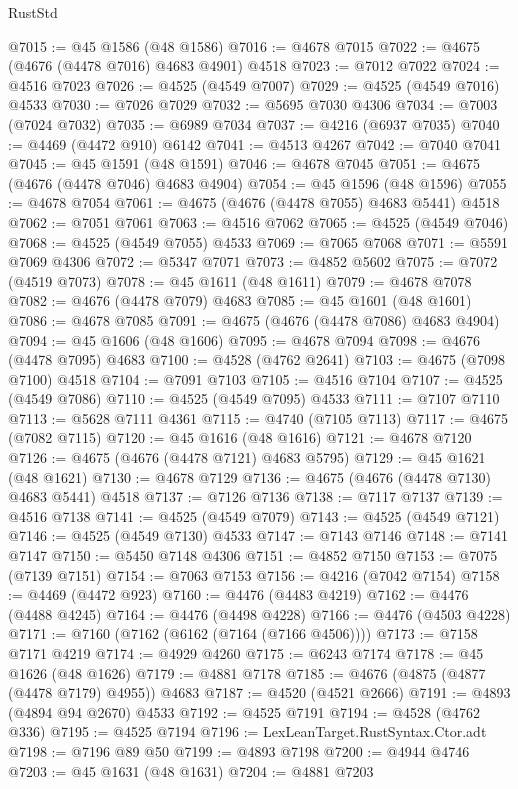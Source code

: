 \begin{lexlean}{RustStd}
\begin{coremodule}
@7015 := @45 @1586 (@48 @1586)
@7016 := @4678 @7015
@7022 := @4675 (@4676 (@4478 @7016) @4683 @4901) @4518
@7023 := @7012 @7022
@7024 := @4516 @7023
@7026 := @4525 (@4549 @7007)
@7029 := @4525 (@4549 @7016) @4533
@7030 := @7026 @7029
@7032 := @5695 @7030 @4306
@7034 := @7003 (@7024 @7032)
@7035 := @6989 @7034
@7037 := @4216 (@6937 @7035)
@7040 := @4469 (@4472 @910) @6142
@7041 := @4513 @4267
@7042 := @7040 @7041
@7045 := @45 @1591 (@48 @1591)
@7046 := @4678 @7045
@7051 := @4675 (@4676 (@4478 @7046) @4683 @4904)
@7054 := @45 @1596 (@48 @1596)
@7055 := @4678 @7054
@7061 := @4675 (@4676 (@4478 @7055) @4683 @5441) @4518
@7062 := @7051 @7061
@7063 := @4516 @7062
@7065 := @4525 (@4549 @7046)
@7068 := @4525 (@4549 @7055) @4533
@7069 := @7065 @7068
@7071 := @5591 @7069 @4306
@7072 := @5347 @7071
@7073 := @4852 @5602
@7075 := @7072 (@4519 @7073)
@7078 := @45 @1611 (@48 @1611)
@7079 := @4678 @7078
@7082 := @4676 (@4478 @7079) @4683
@7085 := @45 @1601 (@48 @1601)
@7086 := @4678 @7085
@7091 := @4675 (@4676 (@4478 @7086) @4683 @4904)
@7094 := @45 @1606 (@48 @1606)
@7095 := @4678 @7094
@7098 := @4676 (@4478 @7095) @4683
@7100 := @4528 (@4762 @2641)
@7103 := @4675 (@7098 @7100) @4518
@7104 := @7091 @7103
@7105 := @4516 @7104
@7107 := @4525 (@4549 @7086)
@7110 := @4525 (@4549 @7095) @4533
@7111 := @7107 @7110
@7113 := @5628 @7111 @4361
@7115 := @4740 (@7105 @7113)
@7117 := @4675 (@7082 @7115)
@7120 := @45 @1616 (@48 @1616)
@7121 := @4678 @7120
@7126 := @4675 (@4676 (@4478 @7121) @4683 @5795)
@7129 := @45 @1621 (@48 @1621)
@7130 := @4678 @7129
@7136 := @4675 (@4676 (@4478 @7130) @4683 @5441) @4518
@7137 := @7126 @7136
@7138 := @7117 @7137
@7139 := @4516 @7138
@7141 := @4525 (@4549 @7079)
@7143 := @4525 (@4549 @7121)
@7146 := @4525 (@4549 @7130) @4533
@7147 := @7143 @7146
@7148 := @7141 @7147
@7150 := @5450 @7148 @4306
@7151 := @4852 @7150
@7153 := @7075 (@7139 @7151)
@7154 := @7063 @7153
@7156 := @4216 (@7042 @7154)
@7158 := @4469 (@4472 @923)
@7160 := @4476 (@4483 @4219)
@7162 := @4476 (@4488 @4245)
@7164 := @4476 (@4498 @4228)
@7166 := @4476 (@4503 @4228)
@7171 := @7160 (@7162 (@6162 (@7164 (@7166 @4506))))
@7173 := @7158 @7171 @4219
@7174 := @4929 @4260
@7175 := @6243 @7174
@7178 := @45 @1626 (@48 @1626)
@7179 := @4881 @7178
@7185 := @4676 (@4875 (@4877 (@4478 @7179) @4955)) @4683
@7187 := @4520 (@4521 @2666)
@7191 := @4893 (@4894 @94 @2670) @4533
@7192 := @4525 @7191
@7194 := @4528 (@4762 @336)
@7195 := @4525 @7194
@7196 := LexLeanTarget.RustSyntax.Ctor.adt
@7198 := @7196 @89 @50
@7199 := @4893 @7198
@7200 := @4944 @4746
@7203 := @45 @1631 (@48 @1631)
@7204 := @4881 @7203

\end{coremodule}
\end{lexlean}

